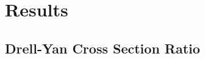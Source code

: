 \documentclass[../main.tex]{subfiles}
\begin{document}
\ifSubfilesClassLoaded{
	\mainmatter
	\setcounter{chapter}{5}
}{}

\chapter{Results}
\label{ch:result}
\section{Drell-Yan Cross Section Ratio}

\FloatBarrier


\ifSubfilesClassLoaded{ \printbibliography[heading=bibintoc,title={References}]}{}
\end{document}
